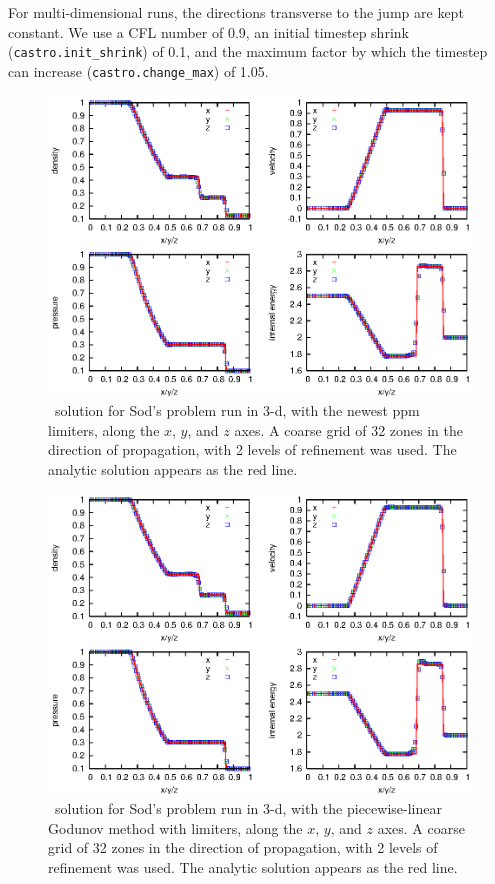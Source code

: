 For multi-dimensional runs, the directions transverse to the jump are
kept constant.  We use a CFL number of 0.9, an initial timestep shrink
({\tt castro.init\_shrink}) of 0.1, and the maximum factor by which
the timestep can increase ({\tt castro.change\_max}) of 1.05.
\begin{figure}[h]
\centering
\includegraphics[width=4.75in]{CastroVerification/sod_3d}
\caption{\label{fig:sod} \castro\ solution for Sod's problem run in 3-d,
  with the newest ppm limiters, 
  along the $x$, $y$, and $z$ axes.  A coarse grid of 32 zones in the
  direction of propagation, with 2 levels of refinement was used.  The
  analytic solution appears as the red line.}
\end{figure}
\begin{figure}[h]
\centering
\includegraphics[width=4.75in]{CastroVerification/sod_3d_ppm0}
\caption{\label{fig:sod_ppm0} \castro\ solution for Sod's problem run in 3-d,
  with the piecewise-linear Godunov method with limiters,
  along the $x$, $y$, and $z$ axes.  A coarse grid of 32 zones in the
  direction of propagation, with 2 levels of refinement was used.  The
  analytic solution appears as the red line.}
\end{figure}

